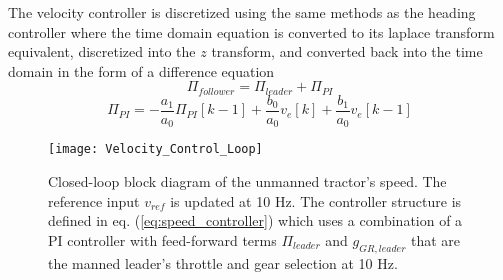 The velocity controller is discretized using the same methods as the heading controller where the time domain equation is converted to its laplace transform equivalent, discretized into the $z$ transform, and converted back into the time domain in the form of a difference equation
\begin{equation}
    \Pi_{follower} = \Pi_{leader} + \Pi_{PI}
\end{equation}
\begin{equation}
    \Pi_{PI} = -\frac{a_1}{a_0}\Pi_{PI}[k-1] + \frac{b_0}{a_0}v_e[k] + \frac{b_1}{a_0}v_e[k-1]
\end{equation}
\begin{figure}[htb]
    \centering
    \texttt{[image: Velocity\_Control\_Loop]}
    \caption{Closed-loop block diagram of the unmanned tractor's speed. The reference input $v_{ref}$ is updated at 10 Hz. The controller structure is defined in eq. (\ref{eq:speed_controller}) which uses a combination of a PI controller with feed-forward terms $\Pi_{leader}$ and $g_{GR,leader}$ that are the manned leader's throttle and gear selection at 10 Hz.}
    \label{fig:Velocity_Control_Loop}
\end{figure}